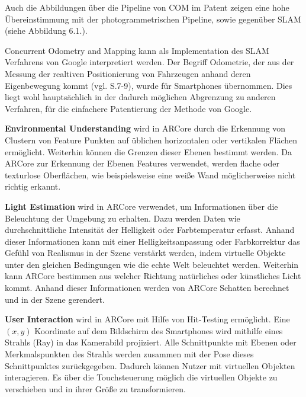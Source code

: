 Auch die Abbildungen über die Pipeline von COM im Patent zeigen eine hohe Übereinstimmung mit der photogrammetrischen Pipeline, sowie gegenüber SLAM (siehe Abbildung 6.1.). 

Concurrent Odometry and Mapping kann als Implementation des SLAM Verfahrens von Google interpretiert werden. Der Begriff Odometrie, der aus der Messung der realtiven Positionierung von Fahrzeugen anhand deren Eigenbewegung kommt (vgl. \cite{odometrie} S.7-9), wurde für Smartphones übernommen. Dies liegt wohl hauptsächlich in der dadurch möglichen Abgrenzung zu anderen Verfahren, für die einfachere Patentierung der Methode von Google. 


\textbf{Environmental Understanding} wird in ARCore durch die Erkennung von Clustern von Feature Punkten auf üblichen horizontalen oder vertikalen Flächen ermöglicht. Weiterhin können die Grenzen dieser Ebenen bestimmt werden. Da ARCore zur Erkennung der Ebenen Features verwendet, werden flache oder texturlose Oberflächen, wie beispielsweise eine weiße Wand möglicherweise nicht richtig erkannt. 

\textbf{Light Estimation} wird in ARCore verwendet, um Informationen über die Beleuchtung der Umgebung zu erhalten. Dazu werden Daten wie durchschnittliche Intensität der Helligkeit oder Farbtemperatur erfasst. Anhand dieser Informationen kann mit einer Helligkeitsanpassung oder Farbkorrektur das Gefühl von Realismus in der Szene verstärkt werden, indem virtuelle Objekte unter den gleichen Bedingungen wie die echte Welt beleuchtet werden. Weiterhin kann ARCore bestimmen aus welcher Richtung natürliches oder künstliches Licht kommt. Anhand dieser Informationen werden von ARCore Schatten berechnet und in der Szene gerendert.

\textbf{User Interaction} wird in ARCore mit Hilfe von \glqq Hit-Testing\grqq{} ermöglicht. Eine $(x,y)$ Koordinate auf dem Bildschirm des Smartphones wird mithilfe eines Strahls (Ray) in das Kamerabild projiziert. Alle Schnittpunkte mit Ebenen oder Merkmalspunkten des Strahls werden zusammen mit der Pose dieses Schnittpunktes zurückgegeben. Dadurch können Nutzer mit virtuellen Objekten interagieren. Es über die Touchsteuerung möglich die virtuellen Objekte zu verschieben und in ihrer Größe zu transformieren. 

